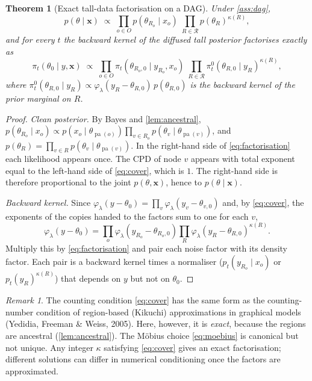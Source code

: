 \documentclass[11pt]{article}
\newtheorem{theorem}{Theorem}
\theoremstyle{definition}
\theoremstyle{remark}
\newtheorem{remark}{Remark}
\newcommand{\lam}{\lambda}
\newcommand{\X}{\mathbf{x}}
\newcommand{\pa}{\operatorname{pa}}
\newcommand{\Rset}{\mathcal{R}}
\begin{document}
\begin{theorem}[Exact tall-data factorisation on a DAG]\label{thm:factorisation}
Under \cref{ass:dag},
\begin{equation}\label{eq:factorisation}
p(\theta\mid\X)\;\propto\;\prod_{o\in O}p(\theta_{R_o}\mid x_o)\;\prod_{R\in\Rset}p(\theta_R)^{\kappa(R)},
\end{equation}
and for every $t$ the backward kernel of the diffused tall posterior factorises
exactly as
\begin{equation}\label{eq:backward-factorisation}
\pi_t(\theta_0\mid y,\X)\;\propto\;\prod_{o\in O}\pi_t(\theta_{R_o,0}\mid y_{R_o},x_o)\;\prod_{R\in\Rset}\pi^0_t(\theta_{R,0}\mid y_R)^{\kappa(R)},
\end{equation}
where $\pi^0_t(\theta_{R,0}\mid y_R)\propto\varphi_\lam(y_R-\theta_{R,0})\,p(\theta_{R,0})$
is the backward kernel of the prior marginal on $R$.
\end{theorem}
\begin{proof}
\emph{Clean posterior.} By Bayes and \cref{lem:ancestral},
$p(\theta_{R_o}\mid x_o)\propto p(x_o\mid\theta_{\pa(o)})\prod_{v\in R_o}p(\theta_v\mid\theta_{\pa(v)})$,
and $p(\theta_R)=\prod_{v\in R}p(\theta_v\mid\theta_{\pa(v)})$. In the right-hand side of
\eqref{eq:factorisation} each likelihood appears once. The CPD of node $v$
appears with total exponent equal to the left-hand side of \eqref{eq:cover},
which is $1$. The right-hand side is therefore proportional to the joint
$p(\theta,\X)$, hence to $p(\theta\mid\X)$.

\emph{Backward kernel.} Since $\varphi_\lam(y-\theta_0)=\prod_v\varphi_\lam(y_v-\theta_{v,0})$
and, by \eqref{eq:cover}, the exponents of the copies handed to the factors sum
to one for each $v$,
\[
\varphi_\lam(y-\theta_0)=\prod_{o}\varphi_\lam(y_{R_o}-\theta_{R_o,0})\prod_{R}\varphi_\lam(y_R-\theta_{R,0})^{\kappa(R)}.
\]
Multiply this by \eqref{eq:factorisation} and pair each noise factor with its
density factor. Each pair is a backward kernel times a normaliser
($p_t(y_{R_o}\mid x_o)$ or $p_t(y_R)^{\kappa(R)}$) that depends on $y$ but not
on $\theta_0$.
\end{proof}

\begin{remark}
The counting condition \eqref{eq:cover} has the same form as the counting-number
condition of region-based (Kikuchi) approximations in graphical models
(Yedidia, Freeman \& Weiss, 2005). Here, however, it is \emph{exact}, because the
regions are ancestral (\cref{lem:ancestral}). The Möbius choice
\eqref{eq:moebius} is canonical but not unique. Any integer $\kappa$ satisfying
\eqref{eq:cover} gives an exact factorisation; different solutions can differ in
numerical conditioning once the factors are approximated.
\end{remark}
\end{document}
